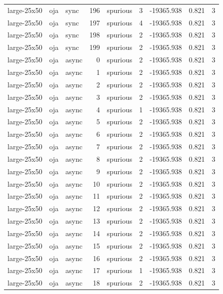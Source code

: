 \begin{tabular}{lllrlrrrr}
large-25x50 & oja & sync & 196 & spurious & 3 & -19365.938 & 0.821 & 3 \\
large-25x50 & oja & sync & 197 & spurious & 4 & -19365.938 & 0.821 & 3 \\
large-25x50 & oja & sync & 198 & spurious & 2 & -19365.938 & 0.821 & 3 \\
large-25x50 & oja & sync & 199 & spurious & 2 & -19365.938 & 0.821 & 3 \\
large-25x50 & oja & async & 0 & spurious & 2 & -19365.938 & 0.821 & 3 \\
large-25x50 & oja & async & 1 & spurious & 2 & -19365.938 & 0.821 & 3 \\
large-25x50 & oja & async & 2 & spurious & 2 & -19365.938 & 0.821 & 3 \\
large-25x50 & oja & async & 3 & spurious & 2 & -19365.938 & 0.821 & 3 \\
large-25x50 & oja & async & 4 & spurious & 1 & -19365.938 & 0.821 & 3 \\
large-25x50 & oja & async & 5 & spurious & 2 & -19365.938 & 0.821 & 3 \\
large-25x50 & oja & async & 6 & spurious & 2 & -19365.938 & 0.821 & 3 \\
large-25x50 & oja & async & 7 & spurious & 2 & -19365.938 & 0.821 & 3 \\
large-25x50 & oja & async & 8 & spurious & 2 & -19365.938 & 0.821 & 3 \\
large-25x50 & oja & async & 9 & spurious & 2 & -19365.938 & 0.821 & 3 \\
large-25x50 & oja & async & 10 & spurious & 2 & -19365.938 & 0.821 & 3 \\
large-25x50 & oja & async & 11 & spurious & 2 & -19365.938 & 0.821 & 3 \\
large-25x50 & oja & async & 12 & spurious & 2 & -19365.938 & 0.821 & 3 \\
large-25x50 & oja & async & 13 & spurious & 2 & -19365.938 & 0.821 & 3 \\
large-25x50 & oja & async & 14 & spurious & 2 & -19365.938 & 0.821 & 3 \\
large-25x50 & oja & async & 15 & spurious & 2 & -19365.938 & 0.821 & 3 \\
large-25x50 & oja & async & 16 & spurious & 2 & -19365.938 & 0.821 & 3 \\
large-25x50 & oja & async & 17 & spurious & 1 & -19365.938 & 0.821 & 3 \\
large-25x50 & oja & async & 18 & spurious & 2 & -19365.938 & 0.821 & 3 \\

\end{tabular}
